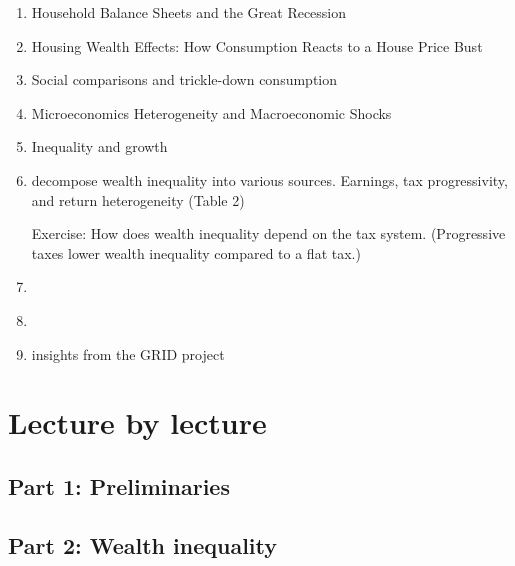 \documentclass[a4paper,12pt]{article}
\begin{document}
\begin{enumerate}
 \item Household Balance Sheets and the Great Recession
 \item Housing Wealth Effects: How Consumption Reacts to a House Price Bust
   \item Social comparisons and trickle-down consumption
     \citep{bertrand2016trickle, bellet2024mcmansion, drechsel2025falling-behind}
   \item Microeconomics Heterogeneity and Macroeconomic Shocks \citep{kaplan2018microeconomic}
   \item Inequality and growth \citep{moll2022uneven}
   \item \citet{hubmer2021sources} decompose wealth inequality into various sources. Earnings, tax progressivity, and return heterogeneity (Table 2)

   Exercise: How does wealth inequality depend on the tax system. (Progressive taxes lower wealth inequality compared to a flat tax.)

   \item \citet{guvenen2023use}
   \item \citet{fagereng2022asset}
   \item \citet{guvenen2022global} insights from the GRID project
\end{enumerate}


\section{Lecture by lecture}

\subsection{Part 1: Preliminaries}

\subsection{Part 2: Wealth inequality}
\end{document}
